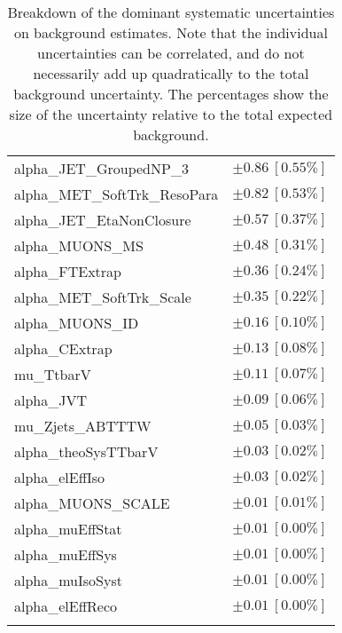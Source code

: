 \begin{table}
\begin{center}
\begin{tabular*}{\textwidth}{@{\extracolsep{\fill}}lc}
alpha\_JET\_GroupedNP\_3         & $\pm 0.86\ [0.55\%] $       \\
alpha\_MET\_SoftTrk\_ResoPara         & $\pm 0.82\ [0.53\%] $       \\
alpha\_JET\_EtaNonClosure         & $\pm 0.57\ [0.37\%] $       \\
alpha\_MUONS\_MS         & $\pm 0.48\ [0.31\%] $       \\
alpha\_FTExtrap         & $\pm 0.36\ [0.24\%] $       \\
alpha\_MET\_SoftTrk\_Scale         & $\pm 0.35\ [0.22\%] $       \\
alpha\_MUONS\_ID         & $\pm 0.16\ [0.10\%] $       \\
alpha\_CExtrap         & $\pm 0.13\ [0.08\%] $       \\
mu\_TtbarV         & $\pm 0.11\ [0.07\%] $       \\
alpha\_JVT         & $\pm 0.09\ [0.06\%] $       \\
mu\_Zjets\_ABTTTW         & $\pm 0.05\ [0.03\%] $       \\
alpha\_theoSysTTbarV         & $\pm 0.03\ [0.02\%] $       \\
alpha\_elEffIso         & $\pm 0.03\ [0.02\%] $       \\
alpha\_MUONS\_SCALE         & $\pm 0.01\ [0.01\%] $       \\
alpha\_muEffStat         & $\pm 0.01\ [0.00\%] $       \\
alpha\_muEffSys         & $\pm 0.01\ [0.00\%] $       \\
alpha\_muIsoSyst         & $\pm 0.01\ [0.00\%] $       \\
alpha\_elEffReco         & $\pm 0.01\ [0.00\%] $       \\
\noalign{\smallskip}\hline\noalign{\smallskip}
\end{tabular*}
\end{center}
\caption[Breakdown of uncertainty on background estimates]{
Breakdown of the dominant systematic uncertainties on background estimates.
Note that the individual uncertainties can be correlated, and do not necessarily add up quadratically to 
the total background uncertainty. The percentages show the size of the uncertainty relative to the total expected background.
\label{table.results.bkgestimate.uncertainties.VRW}}
\end{table}
%